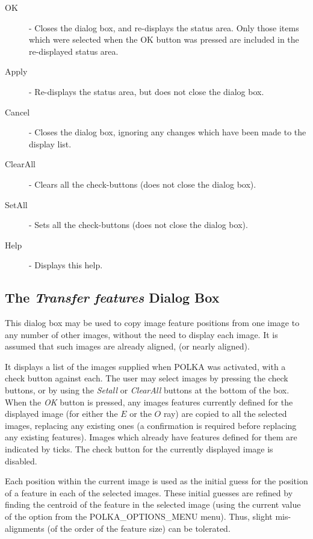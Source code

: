 \documentclass[11pt,nolof]{starlink}
\providecommand{\mylabel}[1] {\xlabel{#1}\label{#1}}
\begin{document}
\begin{description}
\item [OK] - Closes the dialog box, and re-displays the status area.
Only those items which were selected when the OK button was pressed are
included in the re-displayed status area.
\item [Apply] - Re-displays the status area, but does not close the
dialog box.
\item [Cancel] - Closes the dialog box, ignoring any changes which have
been made to the display list.
\item [ClearAll] - Clears all the check-buttons (does not close the dialog box).
\item [SetAll] - Sets all the check-buttons (does not close the dialog box).
\item [Help] - Displays this help.
\end{description}

\subsection {\mylabel{POLKA_TRANSFER_DIALOG}The \emph{Transfer features} Dialog Box}
This dialog box may be used to copy image feature positions from one
image to any number of other images, without the need to display each
image. It is assumed that such images are already aligned, (or nearly
aligned).

It displays a list of the images supplied when POLKA was activated, with
a check button against each. The user may select images by pressing the
check buttons, or by using the \emph{Setall} or \emph{ClearAll} buttons at
the bottom of the box. When the \emph{OK} button is pressed, any images
features currently defined for the displayed image (for either the $E$ or
the $O$ ray) are copied to all the selected images, replacing any
existing ones (a confirmation is required before replacing any existing
features). Images which already have features defined for them are
indicated by ticks. The check button for the currently displayed image is
disabled.

Each position within the current image is used as the initial guess for
the position of a feature in each of the selected images. These initial
guesses are refined by finding the centroid of the feature in the
selected image (using the current value of the  option from the 
{POLKA_OPTIONS_MENU} menu). Thus, slight mis-alignments (of the order of
the feature size) can be tolerated.
\end{document}
